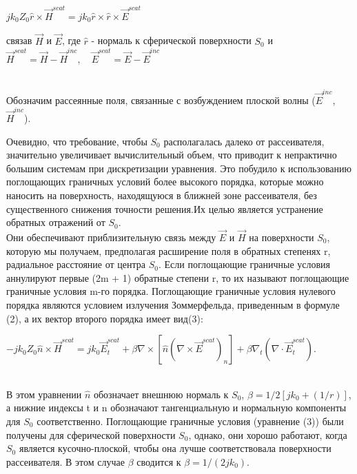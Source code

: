 \begin{center}
	$ jk_{0}Z_{0}\hat{r} \times \vec{H}^{scat} = jk_{0}\hat{r} \times \hat{r} \times \vec{E}^{scat} $ \\
	\begin{center}
связав $ \vec{H} $ и $ \vec{E} $, где $ \hat{r} $ - нормаль к сферической поверхности $ S_{0} $ и \\
		$ \vec{H}^{scat} = \vec{H} - \vec{H}^{inc},\quad \vec{E}^{scat} = \vec{E} - \vec{E}^{inc}$
	\end{center}\\
Обозначим рассеянные поля, связанные с возбуждением плоской волны ($ \vec{E}^{inc} $, $ \vec{H}^{inc} $).
\end{center}
Очевидно, что требование, чтобы $ S_{0} $ располагалась далеко от рассеивателя, значительно увеличивает вычислительный объем, что приводит к непрактично большим системам при дискретизации уравнения. Это побудило к использованию поглощающих граничных условий более высокого порядка, которые можно наносить на поверхность, находящуюся в ближней зоне рассеивателя, без существенного снижения точности решения.Их целью является устранение обратных отражений от $ S_{0} $. \\
Они обеспечивают приблизительную связь между $\vec{E}$ и $\vec{H}$ на поверхности $ S_{0} $, которую мы получаем, предполагая расширение поля в обратных степенях r, радиальное расстояние от центра $S_{0}$. Если поглощающие граничные условия аннулируют первые (2m + 1) обратные степени r, то их называют поглощающие граничные условия m-го порядка.
Поглощающие граничные условия нулевого порядка являются условием излучения Зоммерфельда, приведенным в формуле (2), а их вектор второго порядка имеет вид(3):\\
\begin{center}
	$ -jk_{0}Z_{0}\hat{n} \times \vec{H}^{scat} = jk_{0}\vec{E}_{t}^{scat} + \beta \nabla \times [\hat{n}(\nabla \times \vec{E}^{scat})_{n}] + \beta\nabla_{t} (\nabla \cdot \vec{E}_{t}^{scat})$.
\end{center} \\
В этом уравнении $ \hat{n} $ обозначает внешнюю нормаль к $S_{0}$, $\beta = 1/{2[jk_{0} + (1/r)]}$, а нижние индексы t и n обозначают тангенциальную и нормальную компоненты для $ S_{0} $ соответственно. 
Поглощающие граничные условия (уравнение (3)) были получены для сферической поверхности $ S_{0} $, однако, они хорошо работают, когда $ S_{0} $ является кусочно-плоской, чтобы она лучше соответствовала поверхности рассеивателя.
В этом случае $ \beta $ сводится к $ \beta = 1/(2jk_{0}) $.\\
